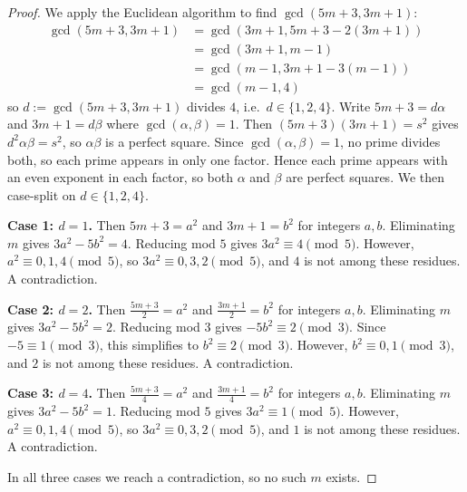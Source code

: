 \documentclass{article}
\begin{document}
\begin{proof}
    We apply the Euclidean algorithm to find $\gcd(5m+3, 3m+1)$:
    \[
    \begin{aligned}
        \gcd(5m+3, 3m+1) 
        &= \gcd(3m+1, 5m+3 - 2(3m+1)) \\
        &= \gcd(3m+1, m-1) \\
        &= \gcd(m-1, 3m+1 - 3(m-1)) \\
        &= \gcd(m-1, 4)
    \end{aligned}
    \]
    so $d := \gcd(5m+3, 3m+1)$ divides $4$, i.e.\ $d \in \{1, 2, 4\}$. Write $5m+3 = d\alpha$ and $3m+1 = d\beta$ 
    where $\gcd(\alpha, \beta) = 1$. Then $(5m+3)(3m+1) = s^2$ gives $d^2\alpha\beta = s^2$, so $\alpha\beta$ is a 
    perfect square. Since $\gcd(\alpha,\beta)=1$, no prime divides both, so each prime appears in only one factor. 
    Hence each prime appears with an even exponent in each factor, so both $\alpha$ and $\beta$ are perfect squares. 
    We then case-split on $d \in \{1, 2, 4\}$.

    \medskip
    \textbf{Case 1: $d = 1$.} Then $5m+3 = a^2$ and $3m+1 = b^2$ for integers $a, b$. Eliminating $m$ gives $3a^2 - 
    5b^2 = 4$. Reducing mod $5$ gives $3a^2 \equiv 4 \pmod{5}$. However, $a^2 \equiv 0, 1, 4 \pmod{5}$, so $3a^2 
    \equiv 0, 3, 2 \pmod{5}$, and $4$ is not among these residues. A contradiction.

    \medskip
    \textbf{Case 2: $d = 2$.} Then $\frac{5m+3}{2} = a^2$ and $\frac{3m+1}{2} = b^2$ for integers $a, b$. Eliminating $m$ 
    gives $3a^2 - 5b^2 = 2$. Reducing mod $3$ gives $-5b^2 \equiv 2 \pmod{3}$. Since $-5 \equiv 1 
    \pmod{3}$, this simplifies to $b^2 \equiv 2 \pmod{3}$. However, $b^2 \equiv 0, 1 \pmod{3}$, and $2$ is not among these 
    residues. A contradiction.

    \medskip
    \textbf{Case 3: $d = 4$.} Then $\frac{5m+3}{4} = a^2$ and $\frac{3m+1}{4} = b^2$ for integers $a, b$. Eliminating $m$ 
    gives $3a^2 - 5b^2 = 1$. Reducing mod $5$ gives $3a^2 \equiv 1 \pmod{5}$. However, $a^2 \equiv 0, 1, 4 \pmod{5}$, so 
    $3a^2 \equiv 0, 3, 2 \pmod{5}$, and $1$ is not among these residues. A contradiction.

    \medskip

    In all three cases we reach a contradiction, so no such $m$ exists.
\end{proof}
\end{document}
